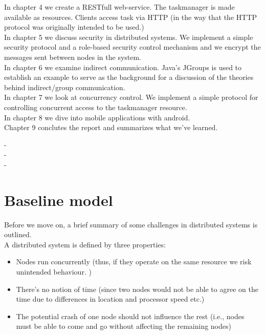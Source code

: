 In chapter 4 we create a RESTfull web-service. The taskmanager is made available as resources. 
Clients access task via HTTP (in the way that the HTTP protocol was originally intended to be used.) \\

In chapter 5 we discuss security in distributed systems. We implement a simple security protocol and a role-based security control mechanism and we encrypt the messages sent between nodes in the system. \\

In chapter 6 we examine indirect communication. Java's JGroups is used to establish an example to serve as the background for a discussion of the theories behind indirect/group communication. \\

In chapter 7 we look at concurrency control. We implement a simple protocol for controlling concurrent access to the taskmanager resource.\\

In chapter 8 we dive into mobile applications with android. \\

Chapter 9 conclutes the report and summarizes what we've learned.



-\\

-\\

-\\

\section{Baseline model}

Before we move on, a brief summary of some challenges in distributed systems is outlined.\\

A distributed system is defined by three properties:
\begin{itemize}

\item Nodes run concurrently (thus, if they operate on the same resource we risk unintended behaviour. )
\item There's no notion of time (since two nodes would not be able to agree on the time due to differences in location and processor speed etc.) 
\item The potential crash of one node should not influence the rest (i.e., nodes must be able to come and go without affecting the remaining nodes)
\end{itemize}

